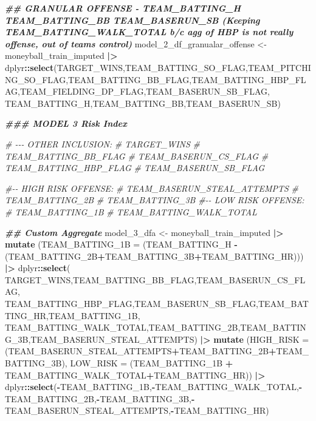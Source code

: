 \documentclass[
]{article}
\newenvironment{Shaded}{\begin{snugshade}}{\end{snugshade}}
\newcommand{\AttributeTok}[1]{\textcolor[rgb]{0.13,0.29,0.53}{#1}}
\newcommand{\CommentTok}[1]{\textcolor[rgb]{0.56,0.35,0.01}{\textit{#1}}}
\newcommand{\DocumentationTok}[1]{\textcolor[rgb]{0.56,0.35,0.01}{\textbf{\textit{#1}}}}
\newcommand{\FunctionTok}[1]{\textcolor[rgb]{0.13,0.29,0.53}{\textbf{#1}}}
\newcommand{\NormalTok}[1]{#1}
\newcommand{\OtherTok}[1]{\textcolor[rgb]{0.56,0.35,0.01}{#1}}
\newcommand{\SpecialCharTok}[1]{\textcolor[rgb]{0.81,0.36,0.00}{\textbf{#1}}}
\begin{document}
\begin{Shaded}
\begin{Highlighting}[]
\DocumentationTok{\#\# GRANULAR OFFENSE {-} TEAM\_BATTING\_H TEAM\_BATTING\_BB TEAM\_BASERUN\_SB (Keeping TEAM\_BATTING\_WALK\_TOTAL b/c agg of HBP is not really offense, out of team\textquotesingle{}s control)}
\NormalTok{model\_2\_df\_granualar\_offense }\OtherTok{\textless{}{-}}\NormalTok{ moneyball\_train\_imputed }\SpecialCharTok{|\textgreater{}} 
\NormalTok{  dplyr}\SpecialCharTok{::}\FunctionTok{select}\NormalTok{(TARGET\_WINS,TEAM\_BATTING\_SO\_FLAG,TEAM\_PITCHING\_SO\_FLAG,TEAM\_BATTING\_BB\_FLAG,TEAM\_BATTING\_HBP\_FLAG,TEAM\_FIELDING\_DP\_FLAG,TEAM\_BASERUN\_SB\_FLAG,}
\NormalTok{         TEAM\_BATTING\_H,TEAM\_BATTING\_BB,TEAM\_BASERUN\_SB)}


\DocumentationTok{\#\#\# MODEL 3 Risk Index}

\CommentTok{\# {-}{-}{-} OTHER INCLUSION: }
\CommentTok{\#     TARGET\_WINS}
\CommentTok{\#     TEAM\_BATTING\_BB\_FLAG}
\CommentTok{\#     TEAM\_BASERUN\_CS\_FLAG}
\CommentTok{\#     TEAM\_BATTING\_HBP\_FLAG}
\CommentTok{\#     TEAM\_BASERUN\_SB\_FLAG}

\CommentTok{\#{-}{-} HIGH RISK OFFENSE:}
\CommentTok{\#     TEAM\_BASERUN\_STEAL\_ATTEMPTS}
\CommentTok{\#     TEAM\_BATTING\_2B}
\CommentTok{\#     TEAM\_BATTING\_3B}
\CommentTok{\#{-}{-} LOW RISK OFFENSE:}
\CommentTok{\#     TEAM\_BATTING\_1B}
\CommentTok{\#     TEAM\_BATTING\_WALK\_TOTAL}

\DocumentationTok{\#\# Custom Aggregate}
\NormalTok{model\_3\_dfa }\OtherTok{\textless{}{-}}\NormalTok{ moneyball\_train\_imputed }\SpecialCharTok{|\textgreater{}}
  \FunctionTok{mutate}\NormalTok{ (}\AttributeTok{TEAM\_BATTING\_1B =}\NormalTok{ (TEAM\_BATTING\_H }\SpecialCharTok{{-}}\NormalTok{ (TEAM\_BATTING\_2B}\SpecialCharTok{+}\NormalTok{TEAM\_BATTING\_3B}\SpecialCharTok{+}\NormalTok{TEAM\_BATTING\_HR))) }\SpecialCharTok{|\textgreater{}}
\NormalTok{  dplyr}\SpecialCharTok{::}\FunctionTok{select}\NormalTok{( TARGET\_WINS,TEAM\_BATTING\_BB\_FLAG,TEAM\_BASERUN\_CS\_FLAG, TEAM\_BATTING\_HBP\_FLAG,TEAM\_BASERUN\_SB\_FLAG,TEAM\_BATTING\_HR,TEAM\_BATTING\_1B,}
\NormalTok{          TEAM\_BATTING\_WALK\_TOTAL,TEAM\_BATTING\_2B,TEAM\_BATTING\_3B,TEAM\_BASERUN\_STEAL\_ATTEMPTS) }\SpecialCharTok{|\textgreater{}}
  \FunctionTok{mutate}\NormalTok{ (}\AttributeTok{HIGH\_RISK =}\NormalTok{   (TEAM\_BASERUN\_STEAL\_ATTEMPTS}\SpecialCharTok{+}\NormalTok{TEAM\_BATTING\_2B}\SpecialCharTok{+}\NormalTok{TEAM\_BATTING\_3B),}
          \AttributeTok{LOW\_RISK =}\NormalTok{ (TEAM\_BATTING\_1B }\SpecialCharTok{+}\NormalTok{ TEAM\_BATTING\_WALK\_TOTAL}\SpecialCharTok{+}\NormalTok{TEAM\_BATTING\_HR)) }\SpecialCharTok{|\textgreater{}}
\NormalTok{  dplyr}\SpecialCharTok{::}\FunctionTok{select}\NormalTok{(}\SpecialCharTok{{-}}\NormalTok{TEAM\_BATTING\_1B,}\SpecialCharTok{{-}}\NormalTok{TEAM\_BATTING\_WALK\_TOTAL,}\SpecialCharTok{{-}}\NormalTok{TEAM\_BATTING\_2B,}\SpecialCharTok{{-}}\NormalTok{TEAM\_BATTING\_3B,}\SpecialCharTok{{-}}\NormalTok{TEAM\_BASERUN\_STEAL\_ATTEMPTS,}\SpecialCharTok{{-}}\NormalTok{TEAM\_BATTING\_HR)}


\end{Highlighting}
\end{Shaded}
\end{document}
